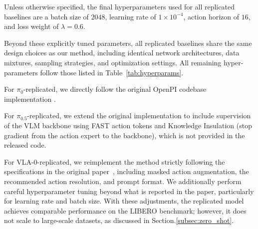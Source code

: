 
Unless otherwise specified, the final hyperparameters used for all replicated baselines are a batch size of $2048$, learning rate of $1\times10^{-4}$, action horizon of $16$, and loss weight of $\lambda=0.6$.

Beyond these explicitly tuned parameters, all replicated baselines share the same design choices as our method, including identical network architectures, data mixtures, sampling strategies, and optimization settings. 
All remaining hyper-parameters follow those listed in Table~\ref{tab:hyperparams}.

For $\pi_{0}$-replicated, we directly follow the original OpenPI codebase implementation \cite{black2024pi0visionlanguageactionflowmodel}. 

For $\pi_{0.5}$-replicated, we extend the original implementation to include supervision of the VLM backbone using FAST action tokens and Knowledge Insulation \cite{driess2025knowledgeinsulatingvisionlanguageactionmodels} (stop gradient from the action expert to the backbone), which is not provided in the released code. 

For VLA-0-replicated, we reimplement the method strictly following the specifications in the original paper~\cite{goyal2025vla0buildingstateoftheartvlas}, including masked action augmentation, the recommended action resolution, and prompt format. We additionally perform careful hyperparameter tuning beyond what is reported in the paper, particularly for learning rate and batch size. With these adjustments, the replicated model achieves comparable performance on the LIBERO benchmark; however, it does not scale to large-scale datasets, as discussed in Section.\ref{subsec:zero_shot}.

